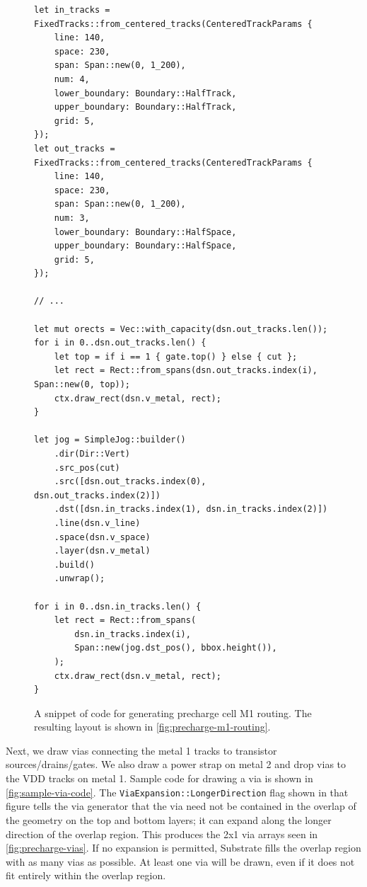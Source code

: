 \begin{figure}[H] \centering
\begin{verbatim}
let in_tracks = FixedTracks::from_centered_tracks(CenteredTrackParams {
    line: 140,
    space: 230,
    span: Span::new(0, 1_200),
    num: 4,
    lower_boundary: Boundary::HalfTrack,
    upper_boundary: Boundary::HalfTrack,
    grid: 5,
});
let out_tracks = FixedTracks::from_centered_tracks(CenteredTrackParams {
    line: 140,
    space: 230,
    span: Span::new(0, 1_200),
    num: 3,
    lower_boundary: Boundary::HalfSpace,
    upper_boundary: Boundary::HalfSpace,
    grid: 5,
});

// ...

let mut orects = Vec::with_capacity(dsn.out_tracks.len());
for i in 0..dsn.out_tracks.len() {
    let top = if i == 1 { gate.top() } else { cut };
    let rect = Rect::from_spans(dsn.out_tracks.index(i), Span::new(0, top));
    ctx.draw_rect(dsn.v_metal, rect);
}

let jog = SimpleJog::builder()
    .dir(Dir::Vert)
    .src_pos(cut)
    .src([dsn.out_tracks.index(0), dsn.out_tracks.index(2)])
    .dst([dsn.in_tracks.index(1), dsn.in_tracks.index(2)])
    .line(dsn.v_line)
    .space(dsn.v_space)
    .layer(dsn.v_metal)
    .build()
    .unwrap();

for i in 0..dsn.in_tracks.len() {
    let rect = Rect::from_spans(
        dsn.in_tracks.index(i),
        Span::new(jog.dst_pos(), bbox.height()),
    );
    ctx.draw_rect(dsn.v_metal, rect);
}
\end{verbatim}
\caption{A snippet of code for generating precharge cell M1 routing.
The resulting layout is shown in \ref{fig:precharge-m1-routing}. \label{fig:precharge-m1-routing-code}}
\end{figure}


Next, we draw vias connecting the metal 1 tracks to transistor sources/drains/gates.
We also draw a power strap on metal 2 and drop vias to the VDD tracks on metal 1.
Sample code for drawing a via is shown in \ref{fig:sample-via-code}.
The \verb|ViaExpansion::LongerDirection| flag shown in that figure tells the via generator
that the via need not be contained in the overlap of the geometry on the top and bottom layers;
it can expand along the longer direction of the overlap region. This produces the 2x1 via arrays
seen in \ref{fig:precharge-vias}. If no expansion is permitted, Substrate fills the overlap region with as many
vias as possible. At least one via will be drawn, even if it does not fit entirely within the overlap region.


